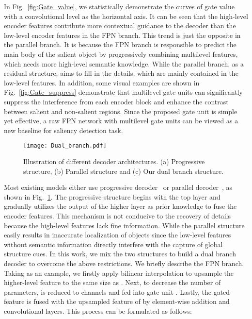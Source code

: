 \documentclass[runningheads]{llncs}
\begin{document}
	
	In Fig.~\ref{fig:Gate_value}, we statistically demonstrate the curves of gate value with a convolutional level as the horizontal axis. 
	It can be seen that the high-level encoder features contribute more contextual guidance to the decoder than the low-level encoder features in the FPN branch. This trend is just the opposite in the parallel branch. It is because the FPN branch is responsible to predict the main body of the salient object by progressively combining multilevel features, which needs more high-level semantic knowledge. While the parallel branch, as a residual structure, aims to fill in the details, which are mainly contained in the low-level features. 
	In addition, some visual examples are shown in Fig.~\ref{fig:Gate_suppress} demonstrate that multilevel gate units can significantly suppress the interference from each encoder block and enhance the contrast between salient and non-salient regions. Since the proposed gate unit is simple yet effective, a raw FPN network with multilevel gate units can be viewed as a new baseline for saliency detection task.
	\begin{figure}[t]
		\centering
		\texttt{[image: Dual\_branch.pdf]}\\


		\caption{Illustration of different decoder architectures. (a) Progressive structure, (b) Parallel structure and (c) Our dual branch structure.}
		\label{fig:Dual_branch}
\end{figure} 
	Most existing models either use progressive decoder~\cite{BMPM,DGRL,PAGRN,PASE} or parallel decoder~\cite{R3Net,PFA}, as shown in Fig.~\ref{fig:Dual_branch}. The progressive structure  begins with the top layer and gradually utilizes the output of the higher layer as prior knowledge to fuse the encoder features. This mechanism is not conducive to the recovery of details because the high-level features lack fine information. While the parallel structure easily results in inaccurate localization of objects since the low-level features without semantic information directly interfere with the capture of global structure cues. In this work, we mix the two structures to build a dual branch decoder to overcome the above restrictions.
	We briefly describe the FPN branch. Taking  as an example, we firstly apply bilinear interpolation to upsample the higher-level feature  to the same size as . Next, to decrease the number of parameters,  is reduced to  channels and fed into gate unit . Lastly, the gated feature is fused with the upsampled feature of  by element-wise addition and convolutional layers. This process can be formulated as follows:
	
\end{document}
